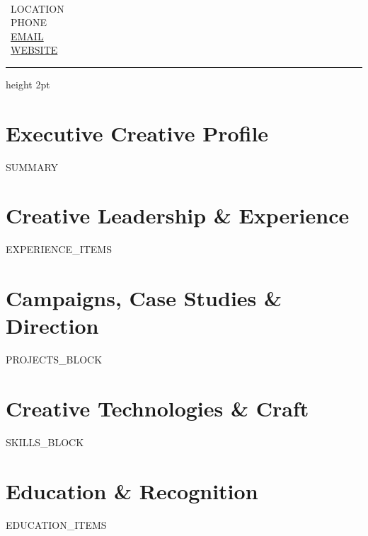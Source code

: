 \documentclass[10pt,letterpaper]{article}
\begin{document}
\begin{minipage}[c]{0.70\textwidth}
  {\Huge \textbf{}} \\[4pt]
  {\normalsize \textbf{}}
\end{minipage}
\hfill
\begin{minipage}[c]{0.28\textwidth}
  \raggedleft \small
  \faMapPin \ {{LOCATION}} \\
  \faPhone* \ {{PHONE}} \\
  \faEnvelope \ \href{mailto:{{EMAIL}}}{{{EMAIL}}}\\
  \faGlobe \ \href{https://{{WEBSITE}}}{{{WEBSITE}}}
\end{minipage}

\vspace{6pt}
{\color{lightline}\hrule height 2pt}
\vspace{6pt}

\section{Executive Creative Profile}
\small
{{SUMMARY}}

\section{Creative Leadership \& Experience}
\small
{{EXPERIENCE_ITEMS}}

\section{Campaigns, Case Studies \& Direction}
\small
{{PROJECTS_BLOCK}}

\section{Creative Technologies \& Craft}
\small
{{SKILLS_BLOCK}}

\section{Education \& Recognition}
\small
{{EDUCATION_ITEMS}}
\end{document}
